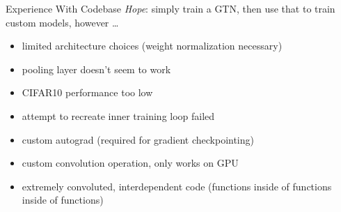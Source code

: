 \documentclass[10pt,usenames,dvipsnames]{beamer}
\begin{document}
\begin{frame}{Experience With Codebase}
    \textit{Hope}: simply train a GTN, then use that to train custom models, however \ldots
    \begin{itemize}
        \item<2-> limited architecture choices (weight normalization necessary)
        \item<3-> pooling layer doesn't seem to work
        \item<4-> CIFAR10 performance too low
        \item<5-> attempt to recreate inner training loop failed
        \item<6-> custom autograd (required for gradient checkpointing) 
        \item<7-> custom convolution operation, only works on GPU
        \item<8-> extremely convoluted, interdependent code (functions inside of functions inside of functions)
    \end{itemize}
\end{frame}
\end{document}
